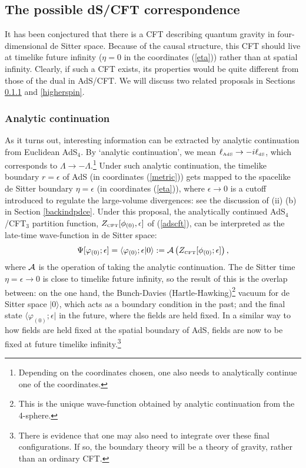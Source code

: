 \documentclass[12pt]{article}
\newcommand\bra[1]{{\langle {#1}|}}
\newcommand\ket[1]{{|{#1}\rangle}}
\def\bra{\langle}
\def\ket{\rangle}
\def\e{\epsilon}
\def\f{\phi}
\def\vf{\varphi}
\def\L{\Lambda}
\renewcommand{\^}[1]{\hat{#1}}
\newcommand{\tn}[1]{\mbox{\tiny #1}}
\newcommand{\bea}{\begin{eqnarray}}
\newcommand{\eea}{\end{eqnarray}}
\newcommand{\eq}[1]{(\ref{#1})}
\begin{document}
\subsection{The possible dS/CFT correspondence}\label{possible}

It has been conjectured that there is a CFT describing quantum gravity in four-dimensional de Sitter space. Because of the causal structure, this CFT should live at timelike future infinity ($\eta=0$ in the coordinates \eq{eta}) rather than at spatial infinity. Clearly, if such a CFT exists, its properties would be quite different from those of the dual in AdS/CFT. We will discuss two related proposals in Sections \ref{analytic} and \ref{higherspin}. 

\subsubsection{Analytic continuation}\label{analytic}

As it turns out, interesting information can be extracted by analytic continuation from Euclidean AdS$_4$. By `analytic continuation', we mean $\ell_{\tn{AdS}}\rightarrow -i\ell_{\tn{dS}}$, which corresponds to $\L\rightarrow-\L$.\footnote{Depending on the coordinates chosen, one also needs to analytically continue one of the coordinates.} Under such analytic continuation, the timelike boundary $r=\e$ of AdS (in coordinates \eq{metric}) gets mapped to the spacelike de Sitter boundary $\eta=\e$ (in coordinates \eq{eta}), where $\e\rightarrow0$ is a cutoff introduced to regulate the large-volume divergences: see the discussion of (ii) (b)  in Section \ref{backindpdce}. Under this proposal, the analytically continued AdS$_4$/CFT$_3$ partition function, $Z_{\tn{CFT}}[\f_{(0)},\e]$ of \eq{adscft}, can be interpreted as the late-time wave-function in de Sitter space:
\bea\label{HH}
\Psi[\vf_{(0)};\e]=\bra\vf_{(0)};\e|0\ket:={\cal A}\left(Z_{\tn{CFT}}[\f_{(0)};\e]\right),
\eea
where ${\cal A}$ is the operation of taking the analytic continuation. The de Sitter time $\eta=\epsilon\rightarrow0$ is close to timelike future infinity, so the result of this is the overlap between: on the one hand, the Bunch-Davies (Hartle-Hawking)\footnote{This is the unique wave-function obtained by analytic continuation from the 4-sphere.} vacuum for de Sitter space $|0\ket$, which acts as a boundary condition in the past; and the final state $\bra\vf_{(0)};\e|$ in the future, where the fields are held fixed. In a similar way to how fields are held fixed at the spatial boundary of AdS, fields are now to be fixed at future timelike infinity.\footnote{\label{f30}There is evidence that one may also need to integrate over these final configurations. If so, the boundary theory will be a theory of gravity, rather than an ordinary CFT.}
\end{document}

